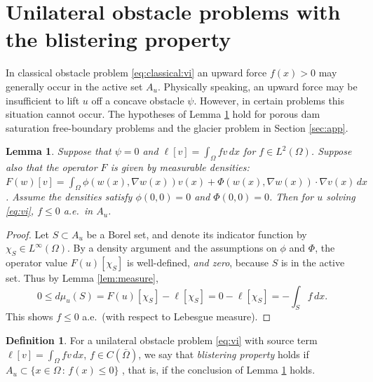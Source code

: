 \documentclass[]{interact}
\theoremstyle{plain}%
\newtheorem{lemma}[theorem]{Lemma}
\theoremstyle{definition}
\newtheorem{definition}[theorem]{Definition}
\theoremstyle{remark}
\newcommand{\grad}{\nabla}
\begin{document}
\appendix
\section{Unilateral obstacle problems with the blistering property} \label{app:blistering}

In classical obstacle problem \eqref{eq:classical:vi} an upward force $f(x)>0$ may generally occur in the active set $A_u$.  Physically speaking, an upward force may be insufficient to lift $u$ off a concave obstacle $\psi$.  However, in certain problems this situation cannot occur.  The hypotheses of Lemma \ref{lem:blister} hold for porous dam saturation free-boundary problems \cite[for example]{AinsworthOdenLee1993} and the glacier problem in Section \ref{sec:app}.

\begin{lemma} \label{lem:blister}
Suppose that $\psi=0$ and $\ell[v] = \int_\Omega fv\,dx$ for $f\in L^2(\Omega)$.  Suppose also that the operator $F$ is given by measurable densities: $F(w)[v]=\int_\Omega \phi(w(x),\grad w(x)) v(x) + \Phi(w(x),\grad w(x)) \cdot \grad v(x)\,dx$.  Assume the densities satisfy $\phi(0,0)=0$ and $\Phi(0,0)=0$.  Then for $u$ solving \eqref{eq:vi}, $f\le 0$ a.e.~in $A_u$.
\end{lemma}

\begin{proof}
Let $S\subset A_u$ be a Borel set, and denote its indicator function by $\chi_S \in L^\infty(\Omega)$.  By a density argument and the assumptions on $\phi$ and $\Phi$, the operator value $F(u)[\chi_S]$ is well-defined, \emph{and zero}, because $S$ is in the active set.  Thus by Lemma \ref{lem:measure},
\begin{equation*}
0 \le d\mu_u(S) = F(u)[\chi_S]-\ell[\chi_S] = 0 - \ell[\chi_S] = -\int_S f\,dx.
\end{equation*}
This shows $f\le 0$ a.e.~(with respect to Lebesgue measure).
\end{proof}

\begin{definition}
For a unilateral obstacle problem \eqref{eq:vi} with source term $\ell[v] = \int_\Omega fv\,dx$, $f\in C(\bar \Omega)$, we say that \emph{blistering property} holds if $A_u \subset \{x \in \Omega\, :\, f(x)\le 0\}$ \cite{JouvetBueler2012}, that is, if the conclusion of Lemma \ref{lem:blister} holds.
\end{definition}
\end{document}
